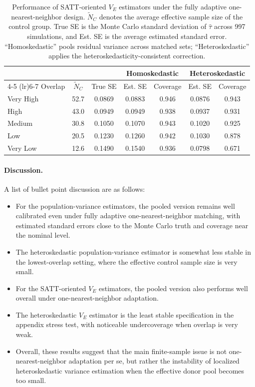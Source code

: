 \documentclass[11pt]{article}
\begin{document}
\begin{table}[hbt!]
\centering
\begin{tabular}{lcccccc}
  \hline
  & & & \multicolumn{2}{c}{Homoskedastic} & \multicolumn{2}{c}{Heteroskedastic} \\
  \cmidrule(lr){4-5} \cmidrule(lr){6-7}
  Overlap & $\tilde{N}_C$ & True SE & Est. SE & Coverage & Est. SE & Coverage \\ 
  \hline
  Very High & 52.7 & 0.0869 & 0.0883 & 0.946 & 0.0876 & 0.943 \\ 
  High      & 43.0 & 0.0949 & 0.0949 & 0.938 & 0.0937 & 0.931 \\ 
  Medium    & 30.8 & 0.1050 & 0.1070 & 0.943 & 0.1020 & 0.925 \\ 
  Low       & 20.5 & 0.1230 & 0.1260 & 0.942 & 0.1030 & 0.878 \\ 
  Very Low  & 12.6 & 0.1490 & 0.1540 & 0.936 & 0.0798 & 0.671 \\ 
   \hline
\end{tabular}
\caption{Performance of SATT-oriented $V_E$ estimators under the fully adaptive one-nearest-neighbor design. $\tilde{N}_C$ denotes the average effective sample size of the control group. True SE is the Monte Carlo standard deviation of $\hat{\tau}$ across 997 simulations, and Est. SE is the average estimated standard error. ``Homoskedastic'' pools residual variance across matched sets; ``Heteroskedastic'' applies the heteroskedasticity-consistent correction.}
\label{tab:toy_var_pooled_vs_het_VE_1nn}
\end{table}

\paragraph{Discussion.}
A list of bullet point discussion are as follows:
\begin{itemize}
    \item For the population-variance estimators, the pooled version remains well calibrated even under fully adaptive one-nearest-neighbor matching, with estimated standard errors close to the Monte Carlo truth and coverage near the nominal level.
    \item The heteroskedastic population-variance estimator is somewhat less stable in the lowest-overlap setting, where the effective control sample size is very small.
    \item For the SATT-oriented $V_E$ estimators, the pooled version also performs well overall under one-nearest-neighbor adaptation.
    \item The heteroskedastic $V_E$ estimator is the least stable specification in the appendix stress test, with noticeable undercoverage when overlap is very weak.
    \item Overall, these results suggest that the main finite-sample issue is not one-nearest-neighbor adaptation per se, but rather the instability of localized heteroskedastic variance estimation when the effective donor pool becomes too small.
\end{itemize}
\end{document}
